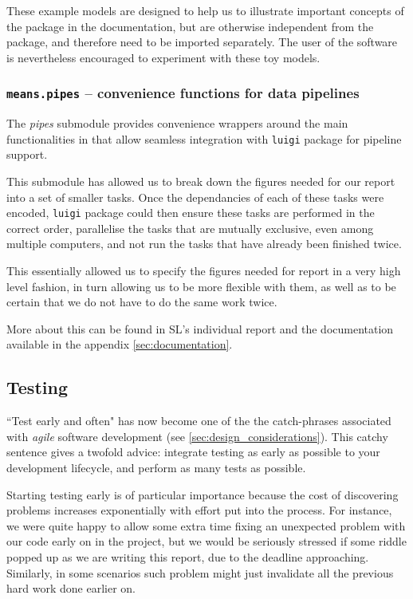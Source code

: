 These example models are designed to help us to illustrate important concepts of the package in the documentation, but are otherwise independent from the package, and therefore need to be imported separately.
The user of the software is nevertheless encouraged to experiment with these toy models.

\subsubsection{{\tt means.pipes} -- convenience functions for data pipelines}
The \emph{pipes} submodule provides convenience wrappers around the main functionalities in \means{} that allow seamless integration with \verb"luigi" package for pipeline support\cite{_luigi_????}.

This submodule has allowed us to break down the figures needed for our report into a set of smaller tasks. 
Once the dependancies of each of these tasks were encoded, \verb"luigi" package could then ensure these tasks are performed in the correct order, parallelise the tasks that are mutually exclusive, even among multiple computers, and not run the tasks that have already been finished twice.

This essentially allowed us to specify the figures needed for report in a very high level fashion, in turn allowing us to be more flexible with them, as well as to be certain that we do not have to do the same work twice.

More about this can be found in SL's individual report and the documentation available in the appendix \autoref{sec:documentation}.


\subsection{Testing}
\label{sec:testing}

``Test early and often" has now become one of the the catch-phrases associated with \emph{agile} software development (see \autoref{sec:design_considerations}). 
This catchy sentence gives a twofold advice: integrate testing as early as possible to your development lifecycle, and perform as many tests as possible.

Starting testing early is of particular importance because the cost of discovering problems increases exponentially with effort put into the process.  
For instance, we were quite happy to allow some extra time fixing an unexpected problem with our code early on in the project, but we would be seriously stressed if some riddle popped up as we are writing this report, due to the deadline approaching. 
Similarly, in some scenarios such problem might just invalidate all the previous hard work done earlier on.

